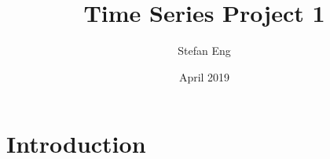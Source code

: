 \documentclass{article}
\title{Time Series Project 1}
\author{Stefan Eng }
\date{April 2019}
\begin{document}
\maketitle

\section{Introduction}
\cite{bd}



\end{document}
